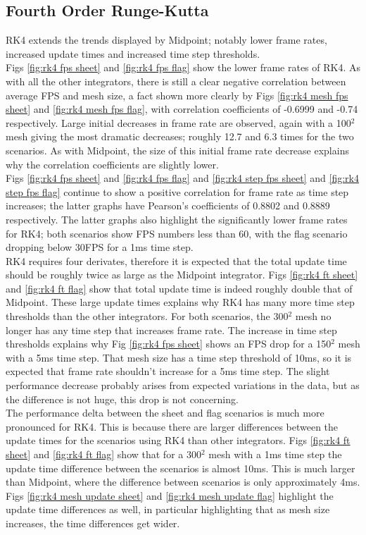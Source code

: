 \subsection{Fourth Order Runge-Kutta}
RK4 extends the trends displayed by Midpoint; notably lower frame rates, increased update times and increased time step thresholds.
\\Figs \ref{fig:rk4 fps sheet} and \ref{fig:rk4 fps flag} show the lower frame rates of RK4. As with all the other integrators, there is still a clear negative correlation between average FPS and mesh size, a fact shown more clearly by Figs \ref{fig:rk4 mesh fps sheet} and \ref{fig:rk4 mesh fps flag}, with correlation coefficients of -0.6999 and -0.74 respectively. Large initial decreases in frame rate are observed, again with a 100$^{2}$ mesh giving the most dramatic decreases; roughly 12.7 and 6.3 times for the two scenarios. As with Midpoint, the size of this initial frame rate decrease explains why the correlation coefficients are slightly lower.
\\Figs \ref{fig:rk4 fps sheet} and \ref{fig:rk4 fps flag} and \ref{fig:rk4 step fps sheet} and \ref{fig:rk4 step fps flag} continue to show a positive correlation for frame rate as time step increases; the latter graphs have Pearson's coefficients of 0.8802 and 0.8889 respectively. The latter graphs also highlight the significantly lower frame rates for RK4; both scenarios show FPS numbers less than 60, with the flag scenario dropping below 30FPS for a 1ms time step.
\\RK4 requires four derivates, therefore it is expected that the total update time should be roughly twice as large as the Midpoint integrator. Figs \ref{fig:rk4 ft sheet} and \ref{fig:rk4 ft flag} show that total update time is indeed roughly double that of Midpoint. These large update times explains why RK4 has many more time step thresholds than the other integrators. For both scenarios, the 300$^{2}$ mesh no longer has any time step that increases frame rate. The increase in time step thresholds explains why Fig \ref{fig:rk4 fps sheet} shows an FPS drop for a 150$^{2}$ mesh with a 5ms time step. That mesh size has a time step threshold of 10ms, so it is expected that frame rate shouldn't increase for a 5ms time step. The slight performance decrease probably arises from expected variations in the data, but as the difference is not huge, this drop is not concerning.
\\The performance delta between the sheet and flag scenarios is much more pronounced for RK4. This is because there are larger differences between the update times for the scenarios using RK4 than other integrators. Figs \ref{fig:rk4 ft sheet} and \ref{fig:rk4 ft flag} show that for a 300$^{2}$ mesh with a 1ms time step the update time difference between the scenarios is almost 10ms. This is much larger than Midpoint, where the difference between scenarios is only approximately 4ms. Figs \ref{fig:rk4 mesh update sheet} and \ref{fig:rk4 mesh update flag} highlight the update time differences as well, in particular highlighting that as mesh size increases, the time differences get wider.
